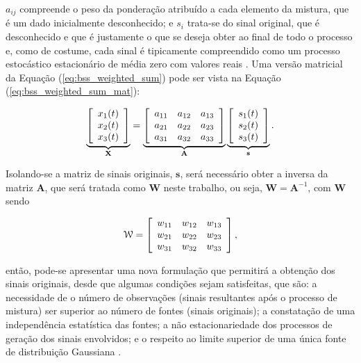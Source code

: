 \noindent $a_{ij}$ compreende o peso da ponderação atribuído a cada elemento da mistura, que é um dado inicialmente desconhecido; e $s_{i}$ trata-se do sinal original, que é desconhecido e que é justamente o que se deseja obter ao final de todo o processo e, como de costume, cada sinal é tipicamente compreendido como um processo estocástico estacionário de média zero com valores reais \citep{papoulis1984probability}. Uma versão matricial da Equação (\ref{eq:bss_weighted_sum}) pode ser vista na Equação (\ref{eq:bss_weighted_sum_mat}):

\begin{equation}
    \underbrace{
    \left[\begin{array}{c}
        x_{1}(t) \\
        x_{2}(t) \\
        x_{3}(t)
    \end{array}\right]}_{\mathbf{X}}
    =
    \underbrace{
    \left[\begin{array}{ccc}
        a_{11} & a_{12} & a_{13} \\
        a_{21} & a_{22} & a_{23} \\
        a_{31} & a_{32} & a_{33}
    \end{array}\right]}_{\mathbf{A}}
    \underbrace{
    \left[\begin{array}{c}
        s_{1}(t) \\
        s_{2}(t) \\
        s_{3}(t)
    \end{array}\right]}_{\mathbf{s}}.
    \vspace{0.2cm}
    \label{eq:bss_weighted_sum_mat}
\end{equation}

Isolando-se a matriz de sinais originais, $\mathbf{s}$, será necessário obter a inversa da matriz $\mathbf{A}$, que será tratada como $\mathbf{W}$ neste trabalho, ou seja, $\mathbf{W} = \mathbf{A}^{-1}$, com $\mathbf{W}$ sendo

\begin{equation}
    \mathbf{\mathcal{W}} = \left[ \begin{array}{ccc}
    w_{11} & w_{12} & w_{13} \\
    w_{21} & w_{22} & w_{23} \\
    w_{31} & w_{32} & w_{33} \end{array} \right],
    \vspace{0.2cm}
\end{equation}

\noindent então, pode-se apresentar uma nova formulação que permitirá a obtenção dos sinais originais, desde que algumas condições sejam satisfeitas, que são: a necessidade de o número de observações (sinais resultantes após o processo de mistura) ser superior ao número de fontes (sinais originais); a constatação de uma independência estatística das fontes; a não estacionariedade dos processos de geração dos sinais envolvidos; e o respeito ao limite superior de uma única fonte de distribuição Gaussiana \citep{COMON1994287, romano2010unsupervised}.


